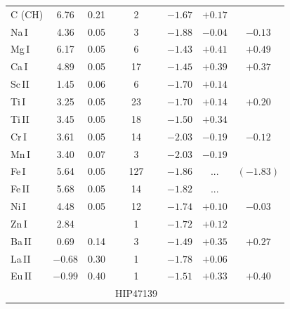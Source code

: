 \documentclass[manuscript]{aastex}
\begin{document}
\begin{table}
\begin{center}
{\begin{tabular}{l c c c c c c }
C (CH) &     6.76 &  0.21     &    2   &      $ -1.67 $  &   $ +0.17 $  &               \\
Na\,I  &     4.36 &  0.05     &    3   &      $ -1.88 $  &   $ -0.04 $  &  $  -0.13  $  \\       
Mg\,I  &     6.17 &  0.05     &    6   &      $ -1.43 $  &   $ +0.41 $  &  $  +0.49  $  \\       
Ca\,I  &     4.89 &  0.05     &    17  &      $ -1.45 $  &   $ +0.39 $  &  $  +0.37  $  \\       
Sc\,II &     1.45 &  0.06     &    6   &      $ -1.70 $  &   $ +0.14 $  &  $         $  \\       
Ti\,I  &     3.25 &  0.05     &    23  &      $ -1.70 $  &   $ +0.14 $  &  $  +0.20  $  \\       
Ti\,II &     3.45 &  0.05     &    18  &      $ -1.50 $  &   $ +0.34 $  &  $         $  \\       
Cr\,I  &     3.61 &  0.05     &    14  &      $ -2.03 $  &   $ -0.19 $  &  $  -0.12  $  \\       
Mn\,I  &     3.40 &  0.07     &    3   &      $ -2.03 $  &   $ -0.19 $  &  $         $  \\       
Fe\,I  &     5.64 &  0.05     &    127 &      $ -1.86 $  &   $ ...   $  &  $ (-1.83) $  \\       
Fe\,II &     5.68 &  0.05     &    14  &      $ -1.82 $  &   $ ...   $  &  $         $  \\       
Ni\,I  &     4.48 &  0.05     &    12  &      $ -1.74 $  &   $ +0.10 $  &  $  -0.03  $  \\    
Zn\,I  &     2.84 &               &    1   &      $ -1.72 $  &   $ +0.12 $  &  $         $  \\      
Ba\,II &     0.69 &  0.14     &    3   &      $ -1.49 $  &   $ +0.35 $  &  $  +0.27  $  \\
La\,II &  $-0.68$ &  0.30     &    1   &      $-1.78$    &   $ +0.06 $  &               \\
Eu\,II &  $-0.99$ &  0.40     &    1   &      $ -1.51 $	 &   $ +0.33 $	&  $  +0.40  $  \\ \hline
       &          &       & HIP47139 &              &             &            \\ \hline


\end{tabular}}
\end{center}
\end{table}
\end{document}
